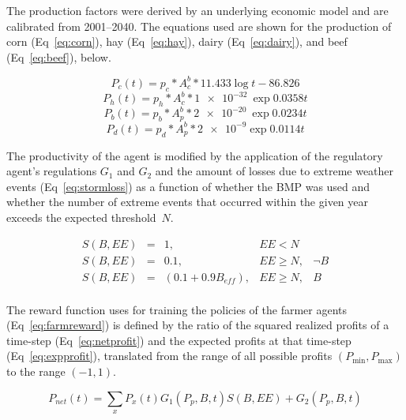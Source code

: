 The production factors were derived by an underlying economic model and
are calibrated from 2001--2040.
The equations used are shown for the production of corn (Eq~\ref{eq:corn}),
hay (Eq~\ref{eq:hay}),
dairy (Eq~\ref{eq:dairy}),
and beef (Eq~\ref{eq:beef}), below.

\begin{equation}
\label{eq:corn}
    P_c(t) = p_c * A_c^b * 11.433\log{t} - 86.826
\end{equation}
\begin{equation}
\label{eq:hay}
    P_h(t) = p_h * A_c^b * \SI{1e-32}{}\exp{0.0358t}
\end{equation}
\begin{equation}
\label{eq:beef}
    P_b(t) = p_b * A_p^b * \SI{2e-20}{}\exp{0.0234t}
\end{equation}
\begin{equation}
\label{eq:dairy}
    P_d(t) = p_d * A_p^b * \SI{2e-9}\exp{0.0114t}
\end{equation}

The productivity of the agent is modified by
the application of the regulatory agent's regulations $G_1$ and $G_2$
and the amount of losses due to extreme weather events (Eq~\ref{eq:stormloss})
as a function of whether the BMP was used and whether the number
of extreme events that occurred within the given year exceeds the
expected threshold~$N$.

\begin{equation}
\label{eq:stormloss}
\begin{array}{lllll}
    S(B, EE) & = & 1, & EE < N & \\
    S(B, EE) & = & 0.1, & EE \ge N, & \neg B \\
    S(B, EE) & = & (0.1 + 0.9 B_{eff}), & EE \ge N, & B \\
\end{array} 
\end{equation}

The reward function uses for training the policies of the
farmer agents (Eq~\ref{eq:farmreward})
is defined by the ratio of the squared 
realized profits of a time-step (Eq~\ref{eq:netprofit})
and the expected profits at that time-step (Eq~\ref{eq:expprofit}),
translated from the range of all possible profits $(P_{\min}, P_{\max})$
to the range $(-1, 1)$.

\begin{equation}
\label{eq:netprofit}
    P_{net}(t) = \sum_x P_x(t) G_1(P_p, B, t) S(B, EE) + G_2(P_p, B, t)
\end{equation}

